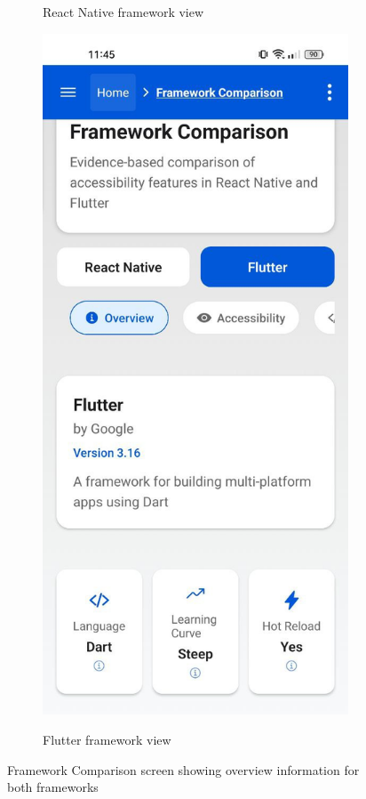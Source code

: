 \begin{figure}[ht]
\begin{subfigure}[b]{0.48\textwidth}
        \caption{React Native framework view}
        \label{fig:framework-comparison-reactnative}
    \end{subfigure}
    \hfill
    \begin{subfigure}[b]{0.48\textwidth}
        \centering
        \includegraphics[width=\linewidth, alt={Framework Comparison Screen with Flutter selected}]{img/overview2.jpg}
        \caption{Flutter framework view}
        \label{fig:framework-comparison-flutter}
    \end{subfigure}
    \caption{Framework Comparison screen showing overview information for both frameworks}
    \label{fig:framework_comparison_main}
\end{figure}

